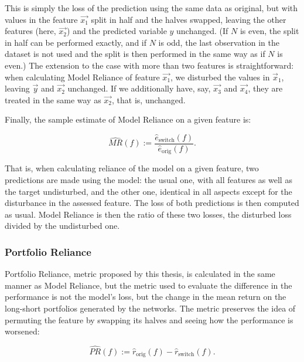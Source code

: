 			This is simply the loss of the prediction using the same data as original, but with values in the feature $\vec{x_1}$ split in half and the halves swapped, leaving the other features (here, $\vec{x_2}$) and the predicted variable $y$ unchanged. (If $N$ is even, the split in half can be performed exactly, and if $N$ is odd, the last observation in the dataset is not used and the split is then performed in the same way as if $N$ is even.) The extension to the case with more than two features is straightforward: when calculating Model Reliance of feature $\vec{x_1}$, we disturbed the values in $\vec{x}_1$, leaving $\vec{y}$ and $\vec{x_2}$ unchanged. If we additionally have, say, $\vec{x_3}$ and $\vec{x_4}$, they are treated in the same way as $\vec{x_2}$, that is, unchanged. 
			
			Finally, the sample estimate of Model Reliance on a given feature is: 
			
			\begin{equation*}
				\widehat{MR}(f):=\frac{\hat{e}_{\text{switch}}(f)}{\hat{e}_{\text{orig}}(f)}.
			\end{equation*}
				
			That is, when calculating reliance of the model on a given feature, two predictions are made using the model: the usual one, with all features as well as the target undisturbed, and the other one, identical in all aspects except for the disturbance in the assessed feature. The loss of both predictions is then computed as usual. Model Reliance is then the ratio of these two losses, the disturbed loss divided by the undisturbed one.   
			
		\subsubsection{Portfolio Reliance}
			\label{chap:portfolio_reliance}
			
			Portfolio Reliance, metric proposed by this thesis, is calculated in the same manner as Model Reliance, but the metric used to evaluate the difference in the performance is not the model's loss, but the change in the mean return on the long-short portfolios generated by the networks. The metric preserves the idea of permuting the feature by swapping its halves and seeing how the performance is worsened: 

			\begin{equation*}
				\widehat{PR}(f):=\hat{r}_{\text{orig}}(f) - \hat{r}_{\text{switch}}(f).
			\end{equation*}
		
